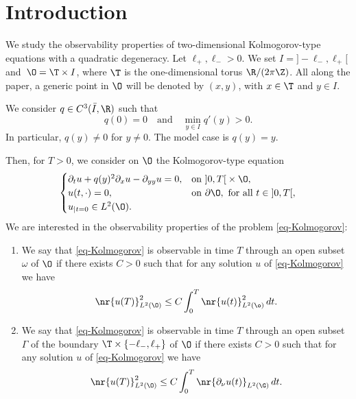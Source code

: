 \section{Introduction}

We study the observability properties of two-dimensional Kolmogorov-type equations with a quadratic degeneracy. Let $\ell_+, \ell_- >0$. We set $I ={} ]-\ell_-,\ell_+[$ and~$\O = \T \times I$, where $\T$ is the one-dimensional torus $\R / (2 \pi \Z)$. All along the paper, a generic point in $\O$ will be denoted by $(x,y)$, with $x \in \T$ and $y \in I$.

We consider $q \in C^3 (\bar I,\R)$ such that
\[
q(0) = 0 \quad \text{and} \quad \min_{y \in I} q'(y) > 0.
\]
In particular, $q(y) \neq 0$ for $y \neq 0$. The model case is $q(y) = y$.

Then, for $T > 0$, we consider on $\O$ the Kolmogorov-type equation
\begin{equation} \label{eq-Kolmogorov}
\begin{cases}
\partial_t u + q(y)^2 \partial_x u - \partial_{yy} u = 0, & \text{on } ]0,T[{}\times \O,\\
u(t,\cdot) = 0, & \text{on } \partial\O, \text{ for all } t \in{}]0,T[,\\
u_{|t=0} \in L^2 (\O).
\end{cases}
\end{equation}
We are interested in the observability properties of the problem \eqref{eq-Kolmogorov}:

\skpt
\begin{definition}
\begin{enumerate}
\item We say that \eqref{eq-Kolmogorov} is observable in time $T$ through an open subset $\omega$ of $\O$ if there exists $C > 0$ such that for any solution $u$ of \eqref{eq-Kolmogorov} we have
\begin{equation} \label{eq-obs-vol}
\nr{u(T)}_{L^2(\O)}^2 \leq C \int_0^T \nr{u(t)}_{L^2(\o)}^2 \, dt.
\end{equation}
\item We say that \eqref{eq-Kolmogorov} is observable in time $T$ through an open subset $\Gamma$ of the boundary $\T \times \{-\ell_-,\ell_+\}$ of $\O$ if there exists $C > 0$ such that for any solution $u$ of \eqref{eq-Kolmogorov} we have
\begin{equation} \label{eq-obs-Gamma}
\nr{u(T)}_{L^2(\O)}^2 \leq C \int_0^T \nr{\partial_\nu u(t)}_{L^2(\G)} \, dt.
\end{equation}
\end{enumerate}
\end{definition}

